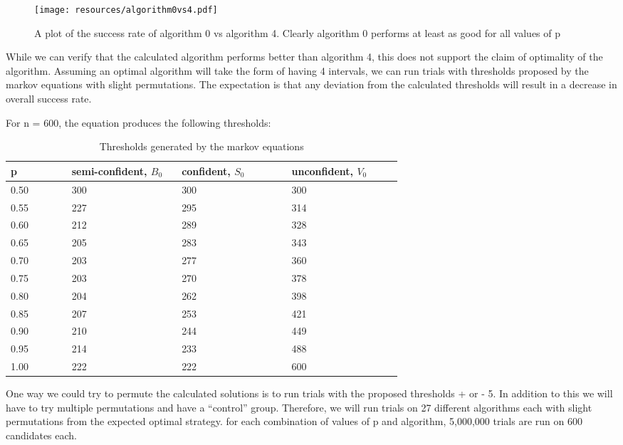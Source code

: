 \documentclass[a4paper,11pt]{article}
\begin{document}
\begin{figure}[H]
    \centering
    \texttt{[image: resources/algorithm0vs4.pdf]}
    \caption{A plot of the success rate of algorithm 0 vs algorithm 4. Clearly algorithm 0 performs at least as good for all values of p}
    \label{fig:plots of algorithm 0 vs 4}
\end{figure}

While we can verify that the calculated algorithm performs better than algorithm 4, this does not support the claim of optimality of the algorithm. Assuming an optimal algorithm will take the form of having 4 intervals, we can run trials with thresholds proposed by the markov equations with slight permutations. The expectation is that any deviation from the calculated thresholds will result in a decrease in overall success rate.

For n = 600, the equation produces the following thresholds:

\begin{table}[H]
\begin{center}
\begin{tabular}{|p{0.10\linewidth}|p{0.18\linewidth}|p{0.18\linewidth}|p{0.18\linewidth}|}

\hline
p & semi-confident, $B_0$&confident, $S_0$& unconfident, $V_0$\\
\hline
0.50 & 300 & 300 & 300 \\
\hline
0.55 &227 & 295 & 314 \\
\hline
0.60 &212& 289 & 328\\
\hline
0.65 &205& 283 &  343\\
\hline
0.70 &203& 277 &  360\\
\hline
0.75 & 203 & 270 &  378\\
\hline
0.80 &204& 262 &  398\\
\hline
0.85 &207& 253 &  421\\
\hline
0.90 &210& 244 &  449\\
\hline
0.95 &214& 233 &  488\\
\hline
1.00 &222& 222 &  600\\
\hline

\end{tabular}
\caption{Thresholds generated by the markov equations}
\end{center}
\end{table}

One way we could try to permute the calculated solutions is to run trials with the proposed thresholds + or - 5. In addition to this we will have to try multiple permutations and have a ``control'' group. Therefore, we will run trials on 27 different algorithms each with slight permutations from the expected optimal strategy. for each combination of values of p and algorithm, 5,000,000 trials are run on 600 candidates each.
\end{document}
